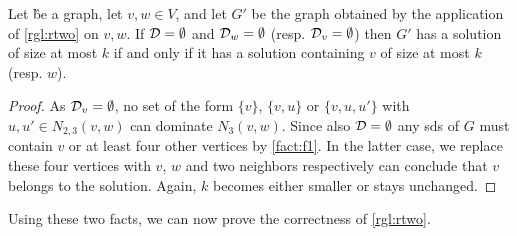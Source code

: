 \begin{fact}\label{fact:f2}
    Let \G be a graph, let $v,w \in V$, and let $G'$ be the graph obtained by the application of \cref{rgl:rtwo} on $v, w$. If $\mathcal{D} = \emptyset$ and $\mathcal{D}_{w} = \emptyset$ (resp. $\mathcal{D}_{v} = \emptyset$) then $G'$ has a solution of size at most $k$ if and only if it has a solution containing $v$ of size at most $k$ (resp. $w$).
\end{fact}
\begin{proof}
As $\mathcal{D}_{v} = \emptyset$, no set of the form $\{v\}$, $\{v, u\}$ or $\{v, u, u'\}$ with $u, u' \in N_{2,3}(v,w)$ can dominate $N_3(v,w)$. 
Since also $\mathcal{D} = \emptyset$ any sds of $G$ must contain $v$ or at least four other vertices by \cref{fact:f1}.
In the latter case, we replace these four vertices with $v$, $w$ and two neighbors respectively can conclude that $v$ belongs to the solution.
Again, $k$ becomes either smaller or stays unchanged.
\end{proof}

Using these two facts, we can now prove the correctness of \cref{rgl:rtwo}.

